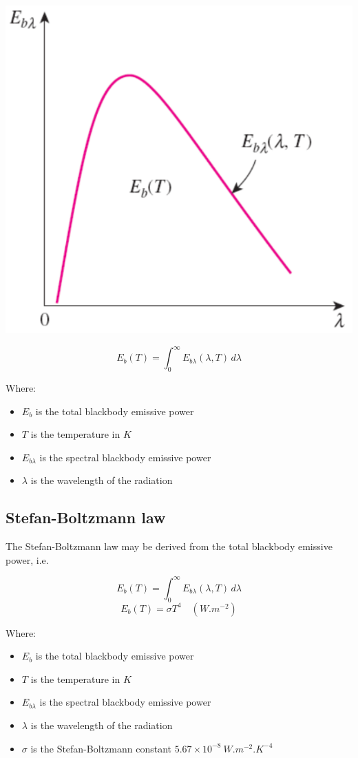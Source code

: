 \documentclass[11pt]{article}
\begin{document}
\begin{center}
\includegraphics[width=.9\linewidth]{./images/total-blackbody-emissive-power-graph.png}
\end{center}

\[E_b (T) = \int_0^{\infty} E_{b \lambda} (\lambda, T) \, d \lambda\]

Where:
\begin{itemize}
\item \(E_b\) is the total blackbody emissive power
\item \(T\) is the temperature in \(\unit{K}\)
\item \(E_{b \lambda}\) is the spectral blackbody emissive power
\item \(\lambda\) is the wavelength of the radiation
\end{itemize}
\subsection{Stefan-Boltzmann law}
\label{sec:org3ad8215}
The Stefan-Boltzmann law may be derived from the total blackbody emissive power, i.e.

\[E_b (T) = \int_0^{\infty} E_{b \lambda} (\lambda, T) \, d \lambda\]
\[E_b (T) = \sigma T^4 \quad (\unit{W.m^{-2}})\]

Where:
\begin{itemize}
\item \(E_b\) is the total blackbody emissive power
\item \(T\) is the temperature in \(\unit{K}\)
\item \(E_{b \lambda}\) is the spectral blackbody emissive power
\item \(\lambda\) is the wavelength of the radiation
\item \(\sigma\) is the Stefan-Boltzmann constant \(5.67 \times 10^{-8} \ \unit{W.m^{-2}.K^{-4}}\)
\end{itemize}
\end{document}
